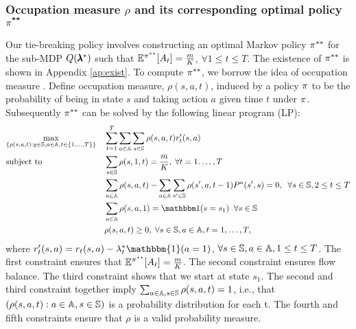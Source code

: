 \subsubsection{Occupation measure $\rho$ and its corresponding optimal policy $\mathbf{\pi}^{\textbf{**}}$}
Our tie-breaking policy involves constructing an optimal Markov policy $\pi^{**}$ for the sub-MDP $Q(\pmb{\lambda}^*)$ such that $\mathbb{E}^{\pi^{**}}[A_t]=\frac{m}{K}$, $\forall 1\leq t\leq T$. 
The existence of $\pi^{**}$ is shown in Appendix \ref{ap:exist}.
To compute $\pi^{**}$, we borrow the idea of occupation measure \citep{DynkinBook}. Define occupation measure, $\rho(s,a,t)$, induced by a policy $\pi$ to be the probability of being in state $s$ and taking action $a$ given time $t$ under $\pi$. Subsequently $\pi^{**}$ can be solved by the following linear program (LP):
\begin{equation}\label{eq:lp}
\begin{aligned}
& \underset{\{\rho(s,a,t):y\in\substates,a\in \subactions,t\in\{1,...,T\}\}}{\text{max}}
& & \sum_{t=1}^{T}\sum_{a\in\subactions}\sum_{s\in\substates}\rho(s,a,t)r'_t(s,a) \\
& \text{subject to}
& & \sum_{s\in\substates}\rho(s,1,t)=\frac{m}{K}, \; \forall t=1.\ldots,T\\
& & & \sum_{a\in \subactions}\rho(s,a,t) - \sum_{a\in\subactions}\sum_{s'\in\substates}\rho(s',a,t-1)\subpr^{a}(s',s)=0, \; \; \forall \substate\in\substates,2\leq t\leq T\\
& & & \sum_{a\in\subactions}\rho(s,a,1)=\ind{s=s_1} \;\;\forall s\in\substates\\
& & & \rho(s,a,t)\geq 0, \; \forall s\in\substates,a\in\subactions,t=1,\ldots,T,
\end{aligned}
\end{equation}
where $r'_t(s,a)=r_t(s,a)-\lambda^*_t\mathbbm{1}(a=1)$, $\forall s\in\mathbb{S}, a\in \mathbb{A}, 1\leq t\leq T$. The first constraint ensures that $\mathbb{E}^{\pi^{**}}[A_t]=\frac{m}{K}$. 
The second constraint ensures flow balance. 
The third constraint shows that we start at state $s_1$. 
The second and third constraint together imply $\sum_{a\in\mathbb{A},s\in\mathbb{S}} \rho(s,a,t)=1$, i.e., that $(\rho(s,a,t) : a\in\mathbb{A},s\in\mathbb{S})$ is a probability distribution for each t.
The fourth and fifth constraints ensure that $\rho$ is a valid probability measure.


